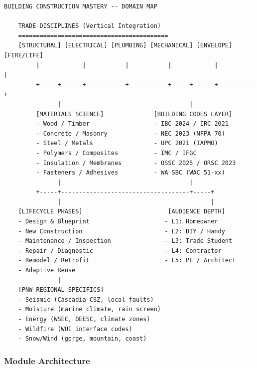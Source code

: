 \documentclass[11pt,letterpaper]{article}
\begin{document}
\begin{asciibox}
\begin{verbatim}
BUILDING CONSTRUCTION MASTERY -- DOMAIN MAP

    TRADE DISCIPLINES (Vertical Integration)
    ==========================================
    [STRUCTURAL] [ELECTRICAL] [PLUMBING] [MECHANICAL] [ENVELOPE] [FIRE/LIFE]
         |            |           |           |            |          |
         +-----+------+-----------+-----------+-----+------+----------+
               |                                    |
         [MATERIALS SCIENCE]              [BUILDING CODES LAYER]
         - Wood / Timber                  - IBC 2024 / IRC 2021
         - Concrete / Masonry             - NEC 2023 (NFPA 70)
         - Steel / Metals                 - UPC 2021 (IAPMO)
         - Polymers / Composites          - IMC / IFGC
         - Insulation / Membranes         - OSSC 2025 / ORSC 2023
         - Fasteners / Adhesives          - WA SBC (WAC 51-xx)
               |                                    |
         +-----+------------------------------------+-----+
               |                                          |
    [LIFECYCLE PHASES]                        [AUDIENCE DEPTH]
    - Design & Blueprint                     - L1: Homeowner
    - New Construction                       - L2: DIY / Handy
    - Maintenance / Inspection               - L3: Trade Student
    - Repair / Diagnostic                    - L4: Contractor
    - Remodel / Retrofit                     - L5: PE / Architect
    - Adaptive Reuse
               |
    [PNW REGIONAL SPECIFICS]
    - Seismic (Cascadia CSZ, local faults)
    - Moisture (marine climate, rain screen)
    - Energy (WSEC, OEESC, climate zones)
    - Wildfire (WUI interface codes)
    - Snow/Wind (gorge, mountain, coast)
\end{verbatim}
\end{asciibox}

\subsubsection{Module Architecture}
\end{document}
